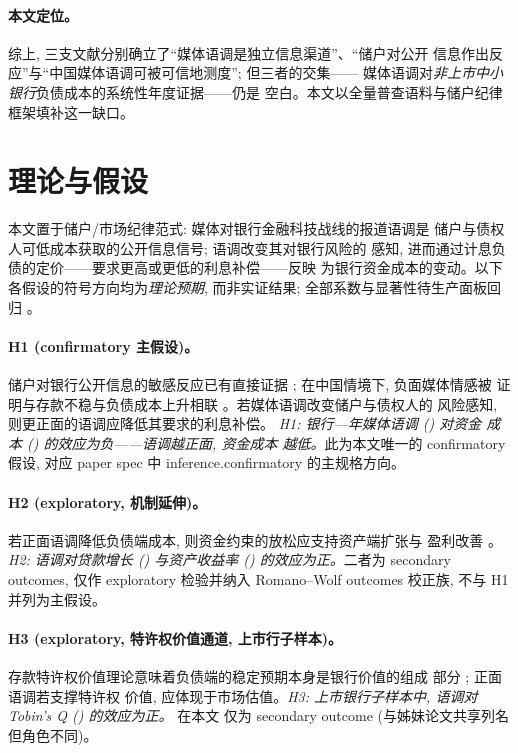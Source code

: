 \paragraph{本文定位。}
综上, 三支文献分别确立了``媒体语调是独立信息渠道''、``储户对公开
信息作出反应''与``中国媒体语调可被可信地测度''; 但三者的交集——
媒体语调对\emph{非上市中小银行}负债成本的系统性年度证据——仍是
空白。本文以全量普查语料与储户纪律框架填补这一缺口。

\section{理论与假设}\label{sec:hypo}

本文置于储户/市场纪律范式: 媒体对银行金融科技战线的报道语调是
储户与债权人可低成本获取的公开信息信号; 语调改变其对银行风险的
感知, 进而通过计息负债的定价——要求更高或更低的利息补偿——反映
为银行资金成本的变动。以下各假设的符号方向均为\emph{理论预期},
而非实证结果; 全部系数与显著性待生产面板回归
。

\paragraph{H1 (confirmatory 主假设)。}
储户对银行公开信息的敏感反应已有直接证据
\parencite{chen2022transparency}; 在中国情境下, 负面媒体情感被
证明与存款不稳与负债成本上升相联
\parencite{fang2024mediadeposit}。若媒体语调改变储户与债权人的
风险感知, 则更正面的语调应降低其要求的利息补偿。
\emph{H1: 银行—年媒体语调 () 对资金
成本 () 的效应为负——语调越正面, 资金成本
越低。}此为本文唯一的 confirmatory 假设, 对应 paper spec 中
inference.confirmatory 的主规格方向。

\paragraph{H2 (exploratory, 机制延伸)。}
若正面语调降低负债端成本, 则资金约束的放松应支持资产端扩张与
盈利改善 \parencite{goldstein2023information}。
\emph{H2: 语调对贷款增长 () 与资产收益率
() 的效应为正。}二者为 secondary outcomes, 仅作
exploratory 检验并纳入 Romano--Wolf outcomes 校正族, 不与 H1
并列为主假设。

\paragraph{H3 (exploratory, 特许权价值通道, 上市行子样本)。}
存款特许权价值理论意味着负债端的稳定预期本身是银行价值的组成
部分 \parencite{drechsler2026franchise}; 正面语调若支撑特许权
价值, 应体现于市场估值。\emph{H3: 上市银行子样本中, 语调对
Tobin's Q () 的效应为正。} 在本文
仅为 secondary outcome (与姊妹论文共享列名但角色不同)。

